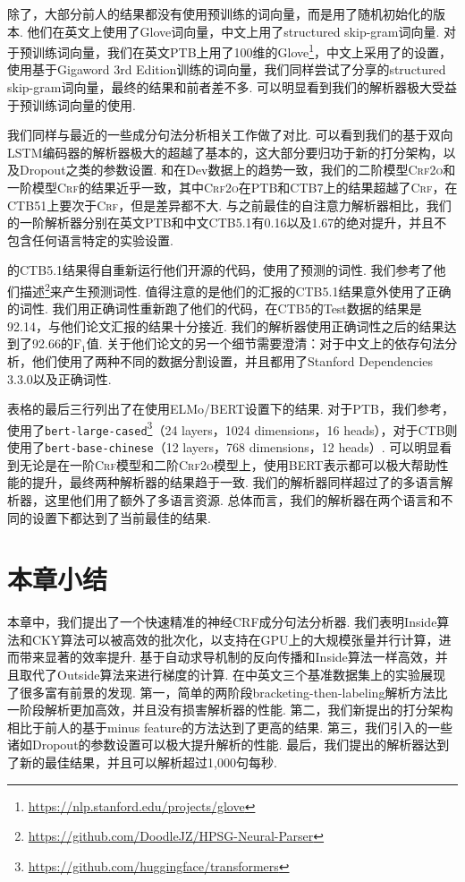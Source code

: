 除了\citep{zhou-zhao-2019-head}，大部分前人的结果都没有使用预训练的词向量，而是用了随机初始化的版本.
他们在英文上使用了Glove词向量，中文上用了structured skip-gram词向量.
对于预训练词向量，我们在英文PTB上用了100维的Glove\footnote{\url{https://nlp.stanford.edu/projects/glove}}，中文上采用了\citep{li-etal-2019-attentive}的设置，使用基于Gigaword 3rd Edition训练的词向量，我们同样尝试了\citep{zhou-zhao-2019-head}分享的structured skip-gram词向量，最终的结果和前者差不多.
可以明显看到我们的解析器极大受益于预训练词向量的使用.

我们同样与最近的一些成分句法分析相关工作做了对比.
可以看到我们的基于双向LSTM编码器的解析器极大的超越了基本的\citep{stern-etal-2017-minimal}，这大部分要归功于新的打分架构，以及Dropout之类的参数设置.
和在Dev数据上的趋势一致，我们的二阶模型\textsc{Crf2o}和一阶模型\textsc{Crf}的结果近乎一致，其中\textsc{Crf2o}在PTB和CTB7上的结果超越了\textsc{Crf}，在CTB51上要次于\textsc{Crf}，但是差异都不大.
与之前最佳的自注意力解析器相比\citep{kitaev-klein-2018-constituency}，我们的一阶解析器分别在英文PTB和中文CTB5.1有0.16以及1.67的绝对提升，并且不包含任何语言特定的实验设置.

\citep{zhou-zhao-2019-head}的CTB5.1结果得自重新运行他们开源的代码，使用了预测的词性.
我们参考了他们描述\footnote{\url{https://github.com/DoodleJZ/HPSG-Neural-Parser}}来产生预测词性.
值得注意的是他们的汇报的CTB5.1结果意外使用了正确的词性.
我们用正确词性重新跑了他们的代码，在CTB5的Test数据的结果是92.14，与他们论文汇报的结果十分接近.
我们的解析器使用正确词性之后的结果达到了92.66的$\mathrm{F}_1$值.
关于他们论文的另一个细节需要澄清：对于中文上的依存句法分析，他们使用了两种不同的数据分割设置，并且都用了Stanford Dependencies 3.3.0以及正确词性.

表格的最后三行列出了在使用ELMo/BERT设置下的结果.
对于PTB，我们参考\citep{kitaev-etal-2019-multilingual}，使用了\texttt{bert-large-cased}\footnote{\url{https://github.com/huggingface/transformers}}（24 layers，1024 dimensions，16 heads），对于CTB则使用了\texttt{bert-base-chinese}（12 layers，768 dimensions，12 heads）.
可以明显看到无论是在一阶\textsc{Crf}模型和二阶\textsc{Crf2o}模型上，使用BERT表示都可以极大帮助性能的提升，最终两种解析器的结果趋于一致.
我们的解析器同样超过了\citep{kitaev-etal-2019-multilingual}的多语言解析器，这里他们用了额外了多语言资源.
总体而言，我们的解析器在两个语言和不同的设置下都达到了当前最佳的结果.

\section{本章小结}\label{sec:con-conclusions}

本章中，我们提出了一个快速精准的神经CRF成分句法分析器.
我们表明Inside算法和CKY算法可以被高效的批次化，以支持在GPU上的大规模张量并行计算，进而带来显著的效率提升.
基于自动求导机制的反向传播和Inside算法一样高效，并且取代了Outside算法来进行梯度的计算.
在中英文三个基准数据集上的实验展现了很多富有前景的发现.
第一，简单的两阶段bracketing-then-labeling解析方法比一阶段解析更加高效，并且没有损害解析器的性能.
第二，我们新提出的打分架构相比于前人的基于minus feature的方法达到了更高的结果.
第三，我们引入的一些诸如Dropout的参数设置可以极大提升解析的性能.
最后，我们提出的解析器达到了新的最佳结果，并且可以解析超过1,000句每秒.
